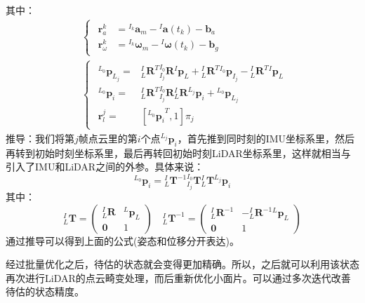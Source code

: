 \documentclass[12pt, twocolumn]{article}
\begin{document}
	其中：
	\begin{equation*}
		\begin{aligned}
		&\begin{cases}
				\begin{aligned}
					\boldsymbol{r}_a^k&={^{I_k}\boldsymbol{a}_m}-{^{I}\boldsymbol{a}(t_k)-\boldsymbol{b}_a}\\
					\boldsymbol{r}_\omega^k&={^{I_k}\boldsymbol{\omega}_m}-{^{I}\boldsymbol{\omega}(t_k)-\boldsymbol{b}_g}
				\end{aligned}
			\end{cases}\\
		&\begin{cases}
			\begin{aligned}
				{^{L_0}\boldsymbol{p}_{L_j}}=&{^{I}_{L}\boldsymbol{R}^T}{^{I_0}_{I_j}\boldsymbol{R}}{^{I}\boldsymbol{p}_L}+{^{I}_{L}\boldsymbol{R}^T}{^{I_0}\boldsymbol{p}_{I_j}}-{^{I}_{L}\boldsymbol{R}^T}{^{I}\boldsymbol{p}_L}\\
				{^{L_0}\boldsymbol{p}_{i}}=&{^{I}_{L}\boldsymbol{R}^T}{^{I_0}_{I_j}\boldsymbol{R}}{^{I}_{L}\boldsymbol{R}}{^{L_j}\boldsymbol{p}_i}+{^{L_0}\boldsymbol{p}_{L_j}}\\
				\boldsymbol{r}_l^j=&\left[{^{L_0}\boldsymbol{p}_i}^T,1\right]\pi_j
			\end{aligned}
		\end{cases}
		\end{aligned}
	\end{equation*}
	推导：我们将第$j$帧点云里的第$i$个点${^{L_j}\boldsymbol{p}_i}$，首先推到同时刻的IMU坐标系里，然后再转到初始时刻坐标系里，最后再转回初始时刻LiDAR坐标系里，这样就相当与引入了IMU和LiDAR之间的外参。具体来说：
	\begin{equation*}
			{^{L_0}\boldsymbol{p}_{i}}={^{I}_{L}\boldsymbol{T}^{-1}}{^{I_0}_{I_j}\boldsymbol{T}}{^{I}_{L}\boldsymbol{T}}{^{L_j}\boldsymbol{p}_i}	
	\end{equation*}
	其中：
	\begin{equation*}
		{^{I}_{L}\boldsymbol{T}}=\begin{pmatrix}
			{^{I}_{L}\boldsymbol{R}}&{^{L}\boldsymbol{p}_{L}}\\
			\boldsymbol{0}&1
		\end{pmatrix}\quad {^{I}_{L}\boldsymbol{T}^{-1}}=\begin{pmatrix}
		{^{I}_{L}\boldsymbol{R}^{-1}}&-{^{I}_{L}\boldsymbol{R}^{-1}}{^{L}\boldsymbol{p}_{L}}\\
		\boldsymbol{0}&1
	\end{pmatrix}
	\end{equation*}
	通过推导可以得到上面的公式(姿态和位移分开表达)。
	
	经过批量优化之后，待估的状态就会变得更加精确。所以，之后就可以利用该状态再次进行LiDAR的点云畸变处理，而后重新优化小面片。可以通过多次迭代改善待估的状态精度。
	
	
	
\end{document}
